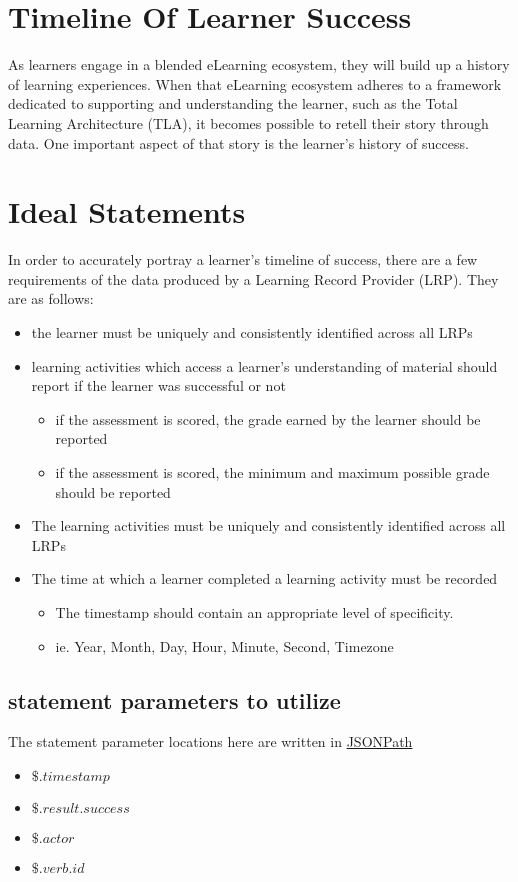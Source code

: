 \documentclass{article}
\begin{document}
\section*{Timeline Of Learner Success}
As learners engage in a blended eLearning ecosystem, they will build up a history of learning experiences. When that eLearning ecosystem adheres to a framework dedicated to supporting and understanding the learner, such as the Total Learning Architecture (TLA), it becomes possible to retell their story through data. One important aspect of that story is the learner's history of success.

\section{Ideal Statements}
In order to accurately portray a learner's timeline of success, there are a few requirements of the data produced by a Learning Record Provider (LRP). They are as follows:
\begin{itemize}
\item the learner must be uniquely and consistently identified across all LRPs
\item learning activities which access a learner's understanding of material should report if the learner was successful or not
  \begin{itemize}
  \item if the assessment is scored, the grade earned by the learner should be reported
  \item if the assessment is scored, the minimum and maximum possible grade should be reported
  \end{itemize}
\item The learning activities must be uniquely and consistently identified across all LRPs
\item The time at which a learner completed a learning activity must be recorded
  \begin{itemize}
  \item The timestamp should contain an appropriate level of specificity.
  \item ie. Year, Month, Day, Hour, Minute, Second, Timezone
  \end{itemize}

\end{itemize}

\subsection{statement parameters to utilize}
The statement parameter locations here are written in \href{http://goessner.net/articles/JsonPath/}{JSONPath}
\begin{itemize}
  \item $\$.timestamp$
  \item $\$.result.success$
  \item $\$.actor$
  \item $\$.verb.id$
  \end{itemize}
\end{document}
